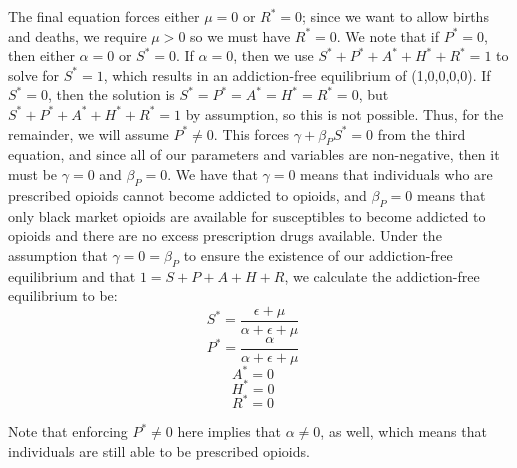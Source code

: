 \documentclass[12pt]{article}
\begin{document}
The final equation forces either $\mu=0$ or $R^*=0$; since we want to allow births and deaths, we require $\mu > 0$ so we must have $R^*=0$. We note that if $P^*=0$, then either $\alpha=0$ or $S^*=0.$ If $\alpha=0$, then we use $S^*+P^*+A^*+H^*+R^*=1$ to solve for $S^*=1$, which results in an addiction-free equilibrium of (1,0,0,0,0). If $S^*=0$, then the solution is $S^*=P^*=A^*=H^*=R^*=0$, but $S^*+P^*+A^*+H^*+R^*=1$ by assumption, so this is not possible. Thus, for the remainder, we will assume $P^* \neq 0. $ This forces $\gamma + \beta_{P} S^* =0$ from the third equation, and since all of our parameters and variables are non-negative, then it must be $\gamma=0$ and $\beta_{P}=0$. We have that $\gamma=0$ means that individuals who are prescribed opioids cannot become addicted to opioids, and $\beta_{P}=0$ means that only black market opioids are available for susceptibles to become addicted to opioids and there are no excess prescription drugs available. Under the assumption that $\gamma=0=\beta_{P}$ to ensure the existence of our addiction-free equilibrium and that $1=S+P+A+H+R$, we calculate the addiction-free equilibrium to be: \\

\[S^*=\frac{\epsilon + \mu}{\alpha + \epsilon +\mu}\quad\]
\[P^*=\frac{\alpha}{\alpha + \epsilon +\mu}\quad\]
\[A^*=0\quad\]
\[H^*=0\quad\]
\[R^*=0\quad\] 

Note that enforcing $P^* \neq 0$ here implies that $\alpha \neq 0$, as well, which means that individuals are still able to be prescribed opioids. 
\end{document}
